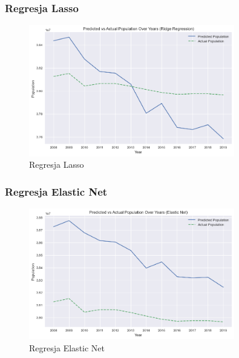 \documentclass[11pt]{article}
\begin{document}
\subsubsection*{Regresja Lasso}
\begin{figure}[H]
        \centering
        \includegraphics[width=0.8\textwidth]{images/lasso.png}
        \caption{Regresja Lasso}
\end{figure}
\subsubsection*{Regresja Elastic Net}
\begin{figure}[H]
        \centering
        \includegraphics[width=0.8\textwidth]{images/elastic_net.png}
        \caption{Regresja Elastic Net}
\end{figure}
\end{document}
